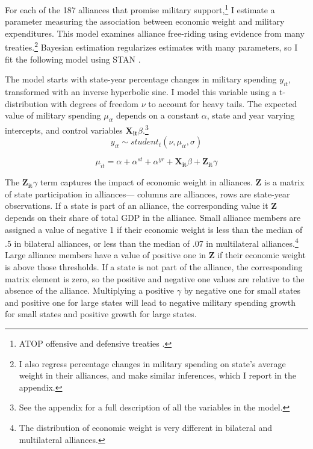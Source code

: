 \documentclass[12pt]{article}
\begin{document}
For each of the 187 alliances that promise military support,\footnote{ATOP offensive and defensive treaties \citep{Leedsetal2002}.} I estimate a parameter measuring the association between economic weight and military expenditures. 
This model examines alliance free-riding using evidence from many treaties.\footnote{I also regress percentage changes in military spending on state's average weight in their alliances, and make similar inferences, which I report in the appendix.}
Bayesian estimation regularizes estimates with many parameters, so I fit the following model using STAN \citep{Carpenteretal2016}.


The model starts with state-year percentage changes in military spending $y_{it}$, transformed with an inverse hyperbolic sine.
I model this variable using a t-distribution with degrees of freedom $\nu$ to account for heavy tails.
The expected value of military spending $\mu_{it}$ depends on a constant $\alpha$, state and year varying intercepts, and control variables $\mathbf{X_{it}} \beta$.\footnote{See the appendix for a full description of all the variables in the model.} 
\begin{equation}
y_{it} \sim student_t(\nu, \mu_{it}, \sigma) 
\end{equation}

\begin{equation}
\mu_{it} = \alpha + \alpha^{st} + \alpha^{yr} + \mathbf{X_{it}} \beta + \mathbf{Z_{it}} \gamma
\end{equation}


The $\mathbf{Z_{it}} \gamma$ term captures the impact of economic weight in alliances.  
$\textbf{Z}$ is a matrix of state participation in alliances--- columns are alliances, rows are state-year observations.  
If a state is part of an alliance, the corresponding value it $\textbf{Z}$ depends on their share of total GDP in the alliance. 
Small alliance members are assigned a value of negative 1 if their economic weight is less than the median of .5 in bilateral alliances, or less than the median of .07 in multilateral alliances.\footnote{The distribution of economic weight is very different in bilateral and multilateral alliances.}
Large alliance members have a value of positive one in $\textbf{Z}$ if their economic weight is above those thresholds. 
If a state is not part of the alliance, the corresponding matrix element is zero, so the positive and negative one values are relative to the absence of the alliance. 
Multiplying a positive $\gamma$ by negative one for small states and positive one for large states will lead to negative military spending growth for small states and positive growth for large states. 
\end{document}
